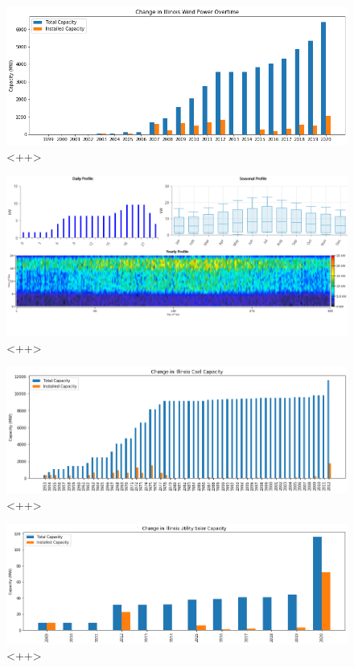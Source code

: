 \begin{figure}[H]
	\centering
	\includegraphics[width=\columnwidth]{./img/annual_installed_cap_wind.png}
	\caption{<++>}
	\label{fig:<++>}
\end{figure}


\begin{figure}[H]
	\centering
	\includegraphics[width=\columnwidth]{./img/homer_illinois_loadprofile.png}
	\caption{<++>}
        \label{fig:<++>}
\end{figure}


\begin{figure}[H]
	\centering
	\includegraphics[width=\columnwidth]{./img/annual_installed_cap_coal.png}
	\caption{<++>}
	\label{fig:<++>}
\end{figure}


\begin{figure}[H]
	\centering
	\includegraphics[width=\columnwidth]{./img/annual_installed_cap_utilityPV.png}
	\caption{<++>}
	\label{fig:<++>}
\end{figure}



